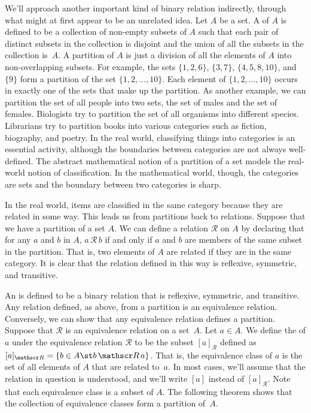 We'll approach another important kind of binary relation indirectly,
through what might at first appear to be an unrelated idea.
Let $A$ be a set.  A  of $A$ is defined to
be a collection of non-empty subsets of $A$ such that each pair of distinct
subsets in the collection is disjoint and the union of all the subsets
in the collection is~$A$.  A partition of $A$ is just a division
of all the elements of $A$ into non-overlapping subsets.
For example, the sets $\{1,2,6\}$, $\{3,7\}$, $\{4,5,8,10\}$,
and $\{9\}$ form a partition of the set $\{1,2,\dots,10\}$.  
Each element of $\{1,2,\dots,10\}$ occurs in exactly one
of the sets that make up the partition.  As another example,
we can partition the set of all people into two sets,
the set of males and the set of females.  Biologists try to
partition the set of all organisms into different species.
Librarians try to partition books into various categories such
as fiction, biography, and poetry.  
In the real world, classifying things into categories is an essential
activity, although the boundaries between categories are not
always well-defined.  The abstract mathematical notion of
a partition of a set models the real-world notion of classification.
In the mathematical world, though, the categories are sets
and the boundary between two categories is sharp.

In the real world, items are classified in the same category
because they are related in some way.  This leads us from
partitions back to relations.  Suppose that we have a partition of
a set $A$.  We can define a relation $\mathscr R$ on $A$ by
declaring that for any $a$ and $b$ in $A$, $a\,{\mathscr R}\,b$
if and only if $a$ and $b$ are members of the same subset in the
partition.  That is, two elements of $A$ are related if they
are in the same category.  It is clear that the relation defined
in this way is reflexive, symmetric, and transitive.

An  is defined to be a binary relation
that is reflexive, symmetric, and transitive.  Any relation defined,
as above, from a partition is an equivalence relation.  Conversely,
we can show that any equivalence relation defines a partition.
Suppose that $\mathscr R$ is an equivalence relation on a set~$A$.
Let $a\in A$.  We define the  of $a$
under the equivalence relation $\mathscr R$ to be the subset
$[a]_{\mathscr R}$ defined as $[a]_{\mathscr R}=\{b\in A\st b\,{\mathscr R}\,a\}$.
That is, the equivalence class of $a$ is the set of all elements of
$A$ that are related to~$a$.  In most cases, we'll assume that the
relation in question is understood, and we'll write $[a]$
instead of $[a]_{\mathscr R}$.  Note that each equivalence
class is a subset of $A$.  The following theorem shows that the
collection of equivalence classes form a partition of~$A$.

